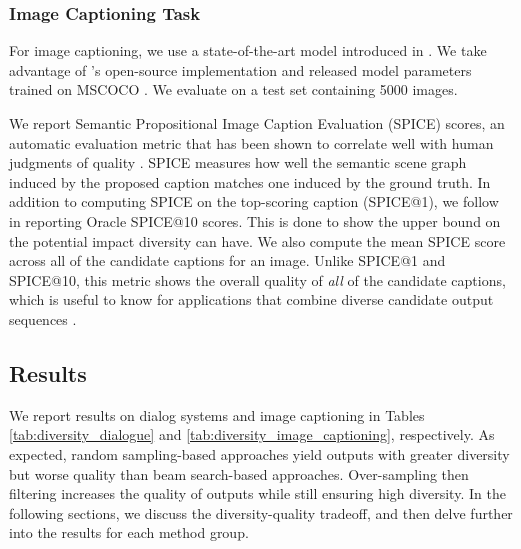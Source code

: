 \documentclass[thesis.tex]{subfiles}
\begin{document}
\begin{table*}[t]
\begin{tabular}{|lr||ccc||ccccc|}
    \end{tabular}
    \caption{Results on 100 dialog prompts. The first row shows the mean human ratings of the single reference response available for each prompt. The next three rows show results for random sampling, with 10 samples drawn per prompt (rs10). The next six rows are variants of beam search using beam size 10 (bs10). The last four rows use random sampling (rs100) or standard beam search (bs100) to generate 100 outputs, then filter down to 10 outputs either through ranking by log-likelihood or by performing post-decoding clustering (PDC). In each section, the highest value is bolded, and statistical ties are marked \textdagger.}
    \label{tab:diversity_dialogue}
\end{table*}

\subsubsection{Image Captioning Task}

For image captioning, we use a state-of-the-art model introduced in \cite{anderson2018bottom}. We take advantage of \cite{luo2017image}'s open-source implementation and released model parameters trained on MSCOCO \citep{lin2014microsoft}. We evaluate on a test set containing 5000 images.

We report Semantic Propositional Image Caption Evaluation (SPICE) scores, an automatic evaluation metric that has been shown to correlate well with human judgments of quality \citep{anderson2016spice}. SPICE measures how well the semantic scene graph induced by the proposed caption matches one induced by the ground truth. In addition to computing SPICE on the top-scoring caption (SPICE@1), we follow \cite{vijayakumar2016diverse} in reporting Oracle SPICE@10 scores. This is done to show the upper bound on the potential impact diversity can have. We also compute the mean SPICE score across all of the candidate captions for an image. Unlike SPICE@1 and SPICE@10, this metric shows the overall quality of \textit{all} of the candidate captions, which is useful to know for applications that combine diverse candidate output sequences \citep{krause2017hierarchical}.

\subsection{Results}
We report results on dialog systems and image captioning in Tables \ref{tab:diversity_dialogue} and \ref{tab:diversity_image_captioning}, respectively. As expected, random sampling-based approaches yield outputs with greater diversity but worse quality than beam search-based approaches.
Over-sampling then filtering increases the quality of outputs while still ensuring high diversity. 
In the following sections, we discuss the diversity-quality tradeoff, and then delve further into the results for each method group.
\end{document}
